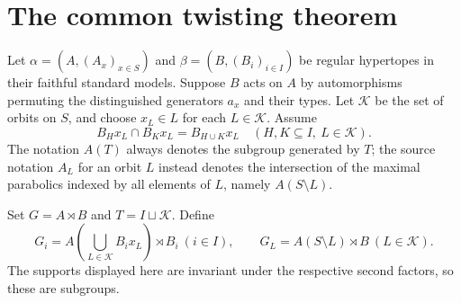 \section{The common twisting theorem}
Let $\alpha=(A,(A_x)_{x\in S})$ and $\beta=(B,(B_i)_{i\in I})$ be regular hypertopes in their faithful standard models. Suppose $B$ acts on $A$ by automorphisms permuting the distinguished generators $a_x$ and their types. Let $\mathcal K$ be the set of orbits on $S$, and choose $x_L\in L$ for each $L\in\mathcal K$. Assume
\begin{equation}\label{eq:admissible}
B_Hx_L\cap B_Kx_L=B_{H\cup K}x_L
\quad(H,K\subseteq I,\ L\in\mathcal K).
\end{equation}
The notation $A(T)$ always denotes the subgroup generated by $T$; the source notation $A_L$ for an orbit $L$ instead denotes the intersection of the maximal parabolics indexed by all elements of $L$, namely $A(S\setminus L)$.

Set $G=A\rtimes B$ and $T=I\sqcup\mathcal K$. Define
\begin{equation}\label{eq:maximal}
G_i=A\left(\bigcup_{L\in\mathcal K}B_ix_L\right)\rtimes B_i\ (i\in I),
\qquad G_L=A(S\setminus L)\rtimes B\ (L\in\mathcal K).
\end{equation}
The supports displayed here are invariant under the respective second factors, so these are subgroups.

